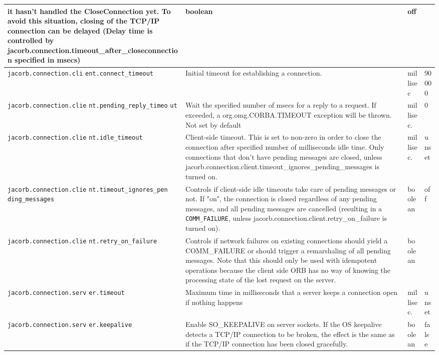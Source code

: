 \begin{small}
\begin{longtable}{|p{5cm}|p{7.5cm}|p{1.5cm}|p{1.5cm}|}
it hasn't handled the CloseConnection yet. To avoid this situation, closing
of the TCP/IP connection can be delayed (Delay time is controlled by
jacorb.connection.timeout\_after\_closeconnection specified in msecs) &
boolean & off \\
\hline
\verb"jacorb.connection.cli"
\verb"ent.connect_timeout" & Initial timeout for establishing a connection.
 & millisec & 90000 \\
\hline
\verb"jacorb.connection.clie"
\verb"nt.pending_reply_timeo"
\verb"ut" &  Wait the specified number of msecs for a reply to a
request. If exceeded, a org.omg.CORBA.TIMEOUT exception will be
thrown. Not set by default & millisec. & 0  \\
\hline
\verb"jacorb.connection.clie"
\verb"nt.idle_timeout" & Client-side timeout. This is set to non-zero in order
to close the connection after specified number of milliseconds idle time. Only
connections that don't have pending messages are closed, unless
jacorb.connection.client.timeout\_ignores\_pending\_messages is turned on. &
millisec. & unset \\
\hline
\verb"jacorb.connection.clie"
\verb"nt.timeout_ignores_pen"
\verb"ding_messages" & Controls if client-side idle timeouts take care of
pending messages or not. If "on", the connection is closed regardless of any
pending messages, and all pending messages are cancelled (resulting in a {\tt
COMM\_FAILURE}, unless jacorb.connection.client.retry\_on\_failure is turned
on).& boolean & off \\
\hline
\verb"jacorb.connection.clie"
\verb"nt.retry_on_failure" & Controls if network failures on existing connections
should yield a COMM\_FAILURE or should trigger a remarshaling
of all pending messages. Note that this should only be used with idempotent
operations because the client side ORB has no way of knowing the processing
state of the lost request on the server. & boolean & \\
\hline
\verb"jacorb.connection.serv"
\verb"er.timeout" & Maximum time in milliseconds that a server keeps a
connection open if nothing happens & millisec. & unset \\
\hline
\verb"jacorb.connection.serv"
\verb"er.keepalive" & Enable SO\_KEEPALIVE on server sockets. If the OS
keepalive detects a TCP/IP connection to be broken, the effect is the same as
if the TCP/IP connection has been closed gracefully. & boolean & false \\


\end{longtable}
\end{small}
